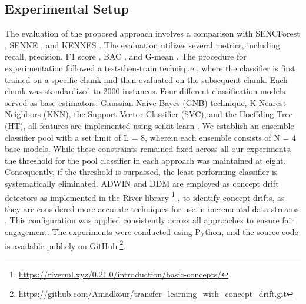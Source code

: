 \subsection{Experimental Setup}
\label{sec:setup}
The evaluation of the proposed approach involves a comparison with SENCForest \cite{mu2017classification}, SENNE \cite{yang2021concept}, and KENNES \cite{zhang2022knnens}. The evaluation utilizes several metrics, including recall, precision, F1 score \cite{sasaki2007truth}, BAC \cite{brodersen2010balanced}, and G-mean \cite{kubat1997addressing}. The procedure for experimentation followed a test-then-train technique \cite{krawczyk2017ensemble}, where the classifier is first trained on a specific chunk and then evaluated on the subsequent chunk. Each chunk was standardized to 2000 instances. Four different classification models served as base estimators: Gaussian Naive Bayes (GNB) technique, K-Nearest Neighbors (KNN), the Support Vector Classifier (SVC), and the Hoeffding Tree (HT), all features are implemented using scikit-learn \cite{ksieniewicz2022stream}. We establish an ensemble classifier pool with a set limit of L = 8, wherein each ensemble consists of N = 4 base models. While these constraints remained fixed across all our experiments, the threshold for the pool classifier in each approach was maintained at eight. Consequently, if the threshold is surpassed, the least-performing classifier is systematically eliminated. ADWIN \cite{adams2023explainable} and DDM \cite{gama2004learning} are employed as concept drift detectors as implemented in the River library \footnote{\url{https://riverml.xyz/0.21.0/introduction/basic-concepts/}} , to identify concept drifts, as they are considered more accurate techniques for use in incremental data streams \cite{gama2004learning,adams2023explainable,madkour2023historical,baena2006early}. This configuration was applied consistently across all approaches to ensure fair engagement. The experiments were conducted using Python, and the source code is available publicly on GitHub \footnote{\url{https://github.com/Amadkour/transfer_learning_with_concept_drift.git}}.
